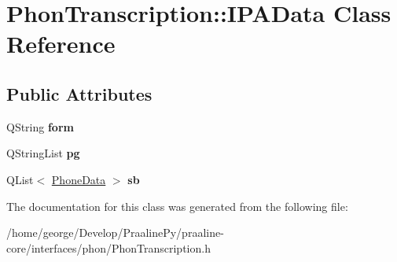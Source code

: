 \hypertarget{class_phon_transcription_1_1_i_p_a_data}{}\section{Phon\+Transcription\+:\+:I\+P\+A\+Data Class Reference}
\label{class_phon_transcription_1_1_i_p_a_data}
\subsection*{Public Attributes}
\begin{DoxyCompactItemize}
\item 
\mbox{\label{class_phon_transcription_1_1_i_p_a_data_ae39a4b0b85abea02de03ac21cf66316f}} 
Q\+String {\bfseries form}
\item 
\mbox{\label{class_phon_transcription_1_1_i_p_a_data_a2e738ab710debb8fa151d56fd219e9dd}} 
Q\+String\+List {\bfseries pg}
\item 
\mbox{\label{class_phon_transcription_1_1_i_p_a_data_ab481aa58d7b993e904014d50e81fd7d4}} 
Q\+List$<$ \hyperlink{class_phon_transcription_1_1_phone_data}{Phone\+Data} $>$ {\bfseries sb}
\end{DoxyCompactItemize}


The documentation for this class was generated from the following file\+:\begin{DoxyCompactItemize}
\item 
/home/george/\+Develop/\+Praaline\+Py/praaline-\/core/interfaces/phon/Phon\+Transcription.\+h\end{DoxyCompactItemize}
